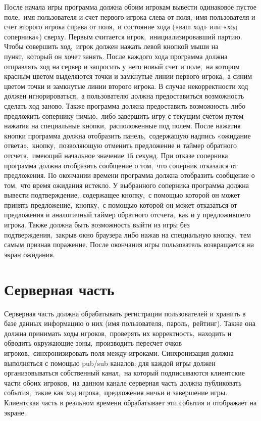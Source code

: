 \documentclass[14pt,a4paper]{report}
\begin{document}
После начала игры программа должна обоим игрокам вывести одинаковое пустое поле,~имя пользователя и счет первого игрока слева от поля,~имя пользователя и счет второго игрока справа от поля,~и состояние хода («ваш ход» или «ход соперника») сверху. Первым считается игрок,~инициализировавший партию. Чтобы совершить ход,~игрок должен нажать левой кнопкой мыши на пункт,~который он хочет занять. После каждого хода программа должна отправлять ход на сервер и запросить у него новый счет и поле,~на котором красным цветом выделяются точки и замкнутые линии первого игрока,~а синим цветом точки и замкнутые линии второго игрока. В случае некорректности ход должен игнорироваться,~а пользователю должна предоставиться возможность сделать ход заново. Также программа должна предоставить возможность либо предложить сопернику ничью,~либо завершить игру с текущим счетом путем нажатия на специальные кнопки,~расположенные под полем. После нажатия кнопки программа должна отобразить панель,~содержащую надпись «ожидание ответа»,~кнопку,~позволяющую отменить предложение и таймер обратного отсчета,~имеющий начальное значение $15$ секунд. При отказе соперника программа должна отобразить сообщение о том,~что соперник отказался от предложения. По окончании времени программа должна отобразить сообщение о том,~что время ожидания истекло. У выбранного соперника программа должна вывести подтверждение,~содержащее кнопку,~с помощью которой он может принять предложение,~кнопку,~с помощью которой он может отказаться от предложения и аналогичный таймер обратного отсчета,~как и у предложившего игрока. Также должна быть возможность выйти из игры без подтверждения,~закрыв окно браузера либо нажав на специальную кнопку,~тем самым признав поражение. После окончания игры пользователь возвращается на экран ожидания.

\section{Серверная часть}
Серверная часть должна обрабатывать регистрации пользователей и хранить в базе данных информацию о них (имя пользователя,~пароль,~рейтинг). Также она должна принимать ходы игроков,~проверять их корректность,~находить и обводить окружающие зоны,~производить пересчет очков игроков,~синхронизировать поля между игроками. Синхронизация должна выполняться с помощью pub/sub каналов: для каждой игры должен организовываться собственный канал,~на который подписываются клиентские части обоих игроков,~на данном канале серверная часть должна публиковать события,~такие как ход игрока,~предложения ничьи и завершение игры. Клиентская часть в реальном времени обрабатывает эти события и отображает на экране.
\end{document}
